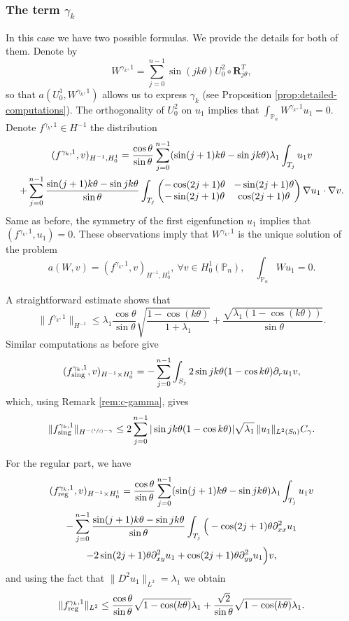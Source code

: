 \documentclass[JEP,XML,SOM,Unicode,ThmDefs,NoFloatCountersInSection,published]{cedram}
\newcommand{\Psfrac}[2]{(\sfrac{#1}{#2})}
\newcommand{\colsep}{\arraycolsep4.5pt}
\theoremstyle{plain}
\theoremstyle{definition}
\newcommand{\bo}[1]{{\boldsymbol#1}}
\newcommand{\reg}{\textup{reg}}
\newcommand{\sing}{\textup{sing}}
\def\Pp{{\mathbb{P}_n}}
\newcommand{\lb}{\lambda}
\begin{document}
\subsubsection*{The term $\gamma_k$} In this case we have two possible formulas. We provide the details for both of them. Denote by
\[
W^{\gamma_k,1} = \sum_{j=0}^{n-1} \sin(jk\theta) U_0^2\circ \bo R_{j\theta}^T,
\]
so that $a(U_0^1,W^{\gamma_k,1})$ allows us to express $\gamma_k$ (see Proposition \ref{prop:detailed-computations}). The orthogonality of $U_0^2$ on $u_1$ implies that $\int_\Pp W^{\gamma_k,1}u_1=0$. Denote $f^{\gamma_k,1} \in H^{-1}$ the distribution
\vspace*{-5pt}
\begin{multline*}
(f^{\gamma_k,1},v)_{H^{-1},H_0^1}
= \frac{\cos\theta}{\sin\theta}\sum_{j=0}^{n-1} (\sin(j+1)k\theta-\sin jk\theta) \lambda_1\int_{T_j} u_1 v\\\colsep
+ \sum_{j=0}^{n-1} \frac{\sin(j+1)k\theta-\sin jk\theta}{\sin \theta} \int_{T_j}\begin{pmatrix}
-\cos (2j+1)\theta & -\sin (2j+1) \theta \\
-\sin(2j+1)\theta & \cos (2j+1)\theta
\end{pmatrix}\nabla u_1 \cdot \nabla v.
\end{multline*}
Same as before, the symmetry of the first eigenfunction $u_1$ implies that $(f^{\gamma_k,1},u_1) = 0$. These observations imply that $W^{\gamma_k,1}$ is the unique solution of the problem
\[
a(W,v) = (f^{\gamma_k,1},v)_{H^{-1},H_0^1},\ \forall v \in H_0^1(\Pp),\quad \int_\Pp Wu_1=0.
\]

A straightforward estimate shows that
\[
\|f^{\gamma_k,1}\|_{H^{-1}} \leq \lambda_1\frac{\cos\theta}{\sin \theta} \sqrt{\frac{1-\cos(k\theta)}{1+\lambda_1}} +\frac{\sqrt{\lambda_1(1-\cos(k\theta))}}{\sin \theta}.
\]
Similar computations as before give
\[
(f_{\sing}^{\gamma_k,1}, v)_{H^{-1}\times H^1_0} = - \sum_{j=0}^{n-1}\int_{S_j} 2 \sin jk\theta(1-\cos k \theta) \partial_r u_1 v,
\]
which, using Remark \ref{rem:c-gamma}, gives
\[
\|f_{\sing}^{\gamma_k,1}\|_{H^{-\Psfrac 12-\gamma}}\le 2\sum_{j=0}^{n-1} | \sin jk\theta(1-\cos k \theta)| \sqrt{\lb_1}\,\|u_1\|_{L^2(S_0)} C_\gamma.
\]

For the regular part, we have
\vspace*{-5pt}
\begin{multline*}
(f_{\reg}^{\gamma_k,1}, v)_{H^{-1}\times H^1_0}= \frac{\cos \theta}{\sin \theta}\sum_{j=0}^{n-1} (\sin (j+1)k\theta-\sin jk\theta) \lb_1 \int_{T_j} u_1v \\
- \sum_{j=0}^{n-1} \frac{\sin(j+1)k\theta-\sin jk\theta}{\sin \theta} \int_{T_j} \Big (-\cos (2j+1)\theta \partial^2_{xx}u_1 \\
-2 \sin (2j+1)\theta \partial^2_{xy} u_1
+ \cos(2j+1)\theta \partial^2_{yy} u_1\Big)v,
\end{multline*}
and using the fact that $\|D^2 u_1\|_{L^2} = \lambda_1$ we obtain
\[
\|f_{\reg}^{\gamma_k,1}\|_{L^2}\le \frac{\cos\theta}{\sin \theta}\sqrt{1-\cos (k \theta)} \lb_1 +\frac{\sqrt{2}}{\sin \theta} \sqrt{1- \cos (k \theta)}\lb_1 .
\]
\end{document}
